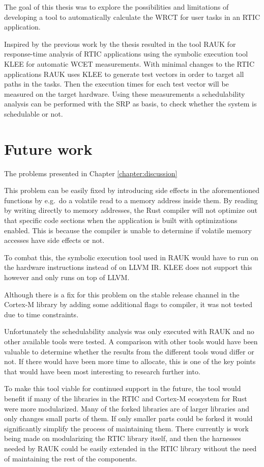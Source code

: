 The goal of this thesis was to explore the possibilities and limitations of
developing a tool to automatically calculate the WRCT for user tasks in an
RTIC application. 

Inspired by the previous work by \cite{lindner} the thesis resulted in the tool
RAUK for response-time analysis of RTIC applications using the symbolic
execution tool KLEE for automatic WCET measurements. With minimal changes to
the RTIC applications RAUK uses KLEE to generate test vectors in order to
target all paths in the tasks. Then the execution times for each test vector
will be measured on the target hardware. Using these measurements a
schedulability analysis can be performed with the SRP as basis, to check
whether the system is schedulable or not.

\section{Future work}
The problems presented in Chapter \ref{chapter:discussion}

This problem can be easily fixed by introducing side effects in the
aforementioned functions by e.g.\ do a volatile read to a memory address
inside them. By reading by writing directly to memory addresses, the Rust
compiler will not optimize out that specific code sections when the application
is built with optimizations enabled. This is because the compiler is unable to
determine if volatile memory accesses have side effects or not.

To combat this, the symbolic execution tool used in
RAUK would have to run on the hardware instructions instead of on LLVM IR. KLEE
does not support this however and only runs on top of LLVM.

Although there is a fix for this problem on the stable release channel in the
Cortex-M library by adding some additional flags to compiler, it was not
tested due to time constraints.

Unfortunately the schedulability analysis was only executed with RAUK and no
other available tools were tested. A comparison with other tools would have
been valuable to determine whether the results from the different tools woud
differ or not. If there would have been more time to allocate, this is one of
the key points that would have been most interesting to research further into.

To make this tool viable for continued support in the future, the tool would
benefit if many of the libraries in the RTIC and Cortex-M ecosystem for Rust
were more modularized. Many of the forked libraries are of larger libraries and
only changes small parts of them. If only smaller parts could be forked it
would significantly simplify the process of maintaining them. There currently
is work being made on modularizing the RTIC library itself, and then the
harnesses needed by RAUK could be easily extended in the RTIC library
without the need of maintaining the rest of the components.
